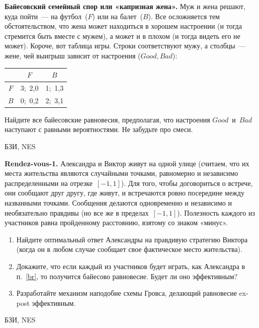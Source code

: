 \begin{problem}
 {\bf Байесовский семейный спор или «капризная
жена».} Муж и жена решают, куда пойти~--- на
футбол~($F$) или на балет~($B$). Все осложняется тем
обстоятельством, что жена может находиться в хорошем
настроении (и тогда стремится быть вместе с мужем), а может
и в плохом (и тогда видеть его не может). Короче, вот
таблица игры. Строки соответствуют мужу, а столбцы~---
жене, чей выигрыш зависит от настроения ($Good,Bad$):
\begin{center}
\begin{tabular}{|c|cc|}
\hline &$F$&$B$\\ \hline $F$&3;\ 2,0&1;\ 1,3\\ $B$&0;\
0,2&2;\ 3,1\\ \hline
\end{tabular}
\end{center}

 Найдите все байесовские равновесия, предполагая, что
настроения $Good$~и~$Bad$ наступают с равными вероятностями. Не
забудьте про смеси.



\begin{source}
БЗИ, NES
\end{source}


\begin{sol}

\end{sol}
\end{problem}



\begin{problem}
 {\bf Rendez-vous-1.} Александра и Виктор живут на
одной улице (считаем, что их места жительства являются
случайными точками, равномерно и независимо распределенными
на отрезке~$[-1,1]$). Для того, чтобы договориться о
встрече, они сообщают друг другу, где живут, и встречаются
ровно посередине между названными точками. Сообщения
делаются одновременно и независимо и необязательно правдивы
(но все же в пределах~$[-1,1]$). Полезность каждого из
участников равна пройденному расстоянию, взятому со знаком
«минус».
\begin{enumerate}
 \item\label{br} Найдите оптимальный ответ Александры на правдивую
стратегию Виктора (когда он в любом случае сообщает свое
фактическое место жительства).
 \item Докажите, что если каждый из участников будет играть, как Александра
в п.~\ref{br}, то получится байесово равновесие. Будет ли
оно эффективным?
 \item Разработайте механизм наподобие схемы Гровса, делающий
равновесие ex-post эффективным.
\end{enumerate}




\begin{source}
БЗИ, NES
\end{source}


\begin{sol}

\end{sol}
\end{problem}




